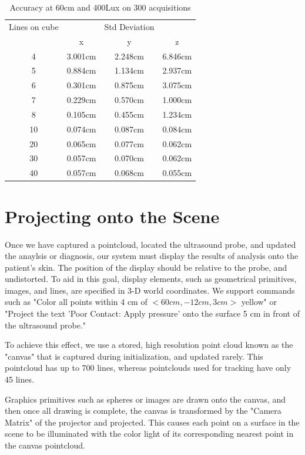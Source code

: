 \documentclass{llncs}
\begin{document}
\begin{table}
\caption{Accuracy at 60cm and 400Lux on 300 acquisitions}
\begin{tabular}{c|ccc}
\hline
\hline
Lines on cube & & Std Deviation & \\
 & x & y & z\\
\hline
4  & 3.001cm & 2.248cm & 6.846cm\\
5  & 0.884cm & 1.134cm & 2.937cm\\
6  & 0.301cm & 0.875cm & 3.075cm\\
7  & 0.229cm & 0.570cm & 1.000cm\\
8  & 0.105cm & 0.455cm & 1.234cm\\
10 & 0.074cm & 0.087cm & 0.084cm\\
20 & 0.065cm & 0.077cm & 0.062cm\\
30 & 0.057cm & 0.070cm & 0.062cm\\
40 & 0.057cm & 0.068cm & 0.055cm\\
\hline

\end{tabular}
\centering
\end{table}


\section{Projecting onto the Scene}

Once we have captured a pointcloud, located the ultrasound probe, and updated the anaylsis or diagnosis, our system must display the results of analysis onto the patient's skin. The position of the display should be relative to the probe, and undistorted. To aid in this goal, display elements, such as geometrical primitives, images, and lines, are specified in 3-D world coordinates. We support commands such as "Color all points within 4 cm of $<60 cm, -12 cm, 3 cm>$ yellow" or "Project the text 'Poor Contact: Apply pressure' onto the surface 5 cm in front of the ultrasound probe."

To achieve this effect, we use a stored, high resolution point cloud known as the "canvas" that is captured during initialization, and updated rarely. This pointcloud has up to 700 lines, whereas pointclouds used for tracking have only 45 lines. 

Graphics primitives such as spheres or images are drawn onto the canvas, and then once all drawing is complete, the canvas is transformed by the "Camera Matrix" of the projector and projected. This causes each point on a surface in the scene to be illuminated with the color light of its corresponding nearest point in the canvas pointcloud. 
\end{document}
